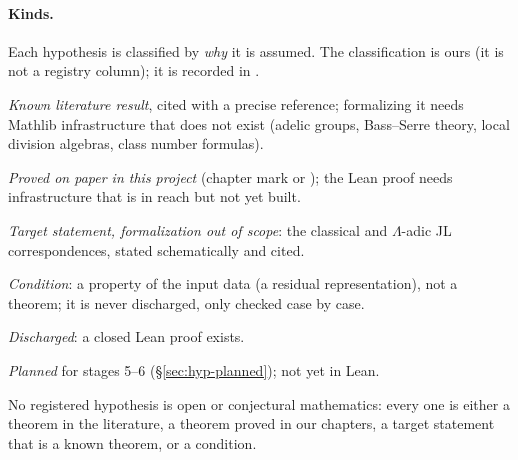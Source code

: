 \paragraph{Kinds.}
Each hypothesis is classified by \emph{why} it is assumed. The classification is ours (it is not a registry column);
it is recorded in .
\begin{description}[leftmargin=1.2em,font=\normalfont]
\item[\kindlit] \emph{Known literature result}, cited with a precise reference; formalizing it needs Mathlib
  infrastructure that does not exist (adelic groups, Bass--Serre theory, local division algebras, class number formulas).
\item[\kindinfra] \emph{Proved on paper in this project} (chapter mark \stproved{} or \stpmc); the Lean proof needs
  infrastructure that is in reach but not yet built.
\item[\kindoos] \emph{Target statement, formalization out of scope}: the classical and $\Lambda$-adic JL
  correspondences, stated schematically and cited.
\item[\kindcond] \emph{Condition}: a property of the input data (a residual representation), not a theorem;
  it is never discharged, only checked case by case.
\item[\kinddis] \emph{Discharged}: a closed Lean proof exists.
\item[\kindplan] \emph{Planned} for stages 5--6 (\S\ref{sec:hyp-planned}); not yet in Lean.
\end{description}
No registered hypothesis is open or conjectural mathematics: every one is either a theorem in the literature, a
theorem proved in our chapters, a target statement that is a known theorem, or a condition.

